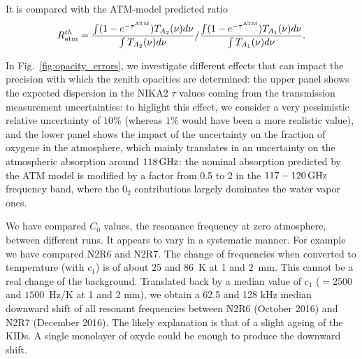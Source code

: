 It is compared with the ATM-model predicted ratio
\begin{equation}
  R_{\rm{atm}}^{th} = \frac{\int (1 - e^{-\tau^{\rm{ATM}}}) T_{A_2}(\nu) d\nu }{\int T_{A_2}(\nu) d\nu} / \frac{\int (1 -
      e^{-\tau^{\rm{ATM}}}) T_{A_{1}}(\nu) d\nu }{\int T_{A_1}(\nu)
        d\nu} .
      \label{eq:opacity_emission_ratio_model}
\end{equation}

In Fig.~\ref{fig:opacity_errors}, we investigate different effects that can impact the precision with
which the zenith opacities are determined: the upper panel shows the
expected dispersion in the NIKA2 $\tau$ values coming from the transmission
measurement uncertainties: to higlight this effect, we consider a very
pessimistic relative uncertainty of $10\%$ (whereas $1\%$ would have
been a more realistic value), and the lower panel shows the impact of the
uncertainty on the fraction of oxygene in the atmosphere, which mainly 
translates in an uncertainty on the atmospheric absorption around
$118\, \rm{GHz}$: the nominal absorption predicted by the ATM model is
modified by a factor from 0.5 to 2 in the $117-120\, \rm{GHz}$
frequency band, where the $0_2$ contributions largely dominates the
water vapor ones. 



We have compared $C_0$ values, the resonance frequency at zero atmosphere,
between different runs. It appears to vary in a systematic manner. For example
we have compared N2R6 and N2R7. The change of frequencies when converted to
temperature (with $c_1$) is of about $25$ and $86$~K at 1 and $2$~mm. This
cannot be a real change of the background. Translated back by a median value
of $c_1$ ($=2500$ and $1500$~Hz/K at 1 and 2 mm), we obtain a 62.5 and 128 kHz
median downward shift of all resonant frequencies between N2R6 (October 2016)
and N2R7 (December 2016). The likely explanation is that of a slight ageing of
the KIDs. A single monolayer of oxyde could be enough to produce the downward
shift.
